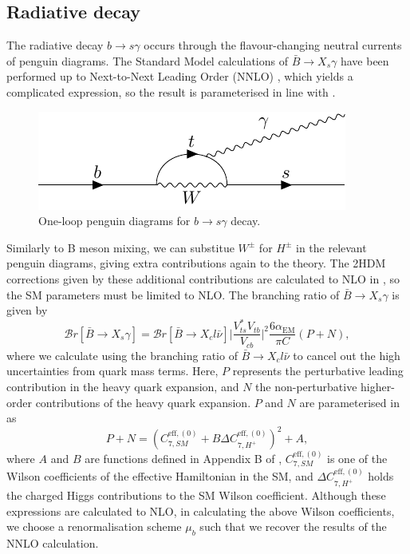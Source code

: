 \documentclass[a4paper,12pt]{article}
\begin{document}
\subsection{Radiative decay}
\label{subsec:rad}
The radiative decay $b\to s\gamma$ occurs through the flavour-changing neutral currents of penguin diagrams.
The Standard Model calculations of $\bar{B}\to X_s\gamma$ have been performed up to Next-to-Next Leading Order (NNLO) \cite{nnlo}, which yields a complicated expression, so the result is parameterised in line with \cite{desc,susy}.
\begin{figure}[H]
    \centering
    \includegraphics[width=\textwidth]{bsgam.pdf}
    \caption{\label{fig:bsgam} One-loop penguin diagrams for $b\to s\gamma$ decay.}
\end{figure}
Similarly to B meson mixing, we can substitue $W^\pm$ for $H^\pm$ in the relevant penguin diagrams, giving extra contributions again to the theory. 
The 2HDM corrections given by these additional contributions are calculated to NLO in \cite{susy}, so the SM parameters must be limited to NLO.
The branching ratio of $\bar{B}\to X_s\gamma$ is given by
\begin{equation}
    \label{eq:xsgam}
    \mathcal{B}r[\bar{B}\to X_s\gamma] = \mathcal{B}r[\bar{B}\to X_cl\bar{\nu}] \bigg|\frac{V_{ts}^*V_{tb}}{V_{cb}}\bigg|^2 \frac{6\alpha_{\text{EM}}}{\pi C}(P+N),
\end{equation}
where we calculate using the branching ratio of $\bar{B}\to X_cl\bar{\nu}$ to cancel out the high uncertainties from quark mass terms.
Here, $P$ represents the perturbative leading contribution in the heavy quark expansion, and $N$ the non-perturbative higher-order contributions of the heavy quark expansion.
$P$ and $N$ are parameterised in \cite{desc,susy} as 
\begin{equation}
    \label{eq:pplsn}
    P+N = (C^{\text{eff},(0)}_{7,SM}+B\Delta C_{7,H^+}^{\text{eff},(0)})^2+A,
\end{equation}
where $A$ and $B$ are functions defined in Appendix B of \cite{desc}, $C_{7,SM}^{\text{eff},(0)}$ is one of the Wilson coefficients of the effective Hamiltonian in the SM, and $\Delta C_{7,H^+}^{\text{eff},(0)}$ holds the charged Higgs contributions to the SM Wilson coefficient. 
Although these expressions are calculated to NLO, in calculating the above Wilson coefficients, we choose a renormalisation scheme $\mu_b$ such that we recover the results of the NNLO calculation. 
\end{document}
